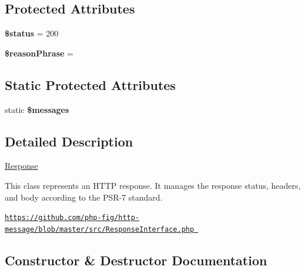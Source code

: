\subsection*{Protected Attributes}
\begin{DoxyCompactItemize}
\item 
\mbox{\label{class_pes_1_1_http_1_1_response_a58391ea75f2d29d5d708d7050b641c33}} 
{\bfseries \$status} = 200
\item 
\mbox{\label{class_pes_1_1_http_1_1_response_a78c4411594f692d36dd7b71e80bc8254}} 
{\bfseries \$reason\+Phrase} = \textquotesingle{}\textquotesingle{}
\end{DoxyCompactItemize}
\subsection*{Static Protected Attributes}
\begin{DoxyCompactItemize}
\item 
static {\bfseries \$messages}
\end{DoxyCompactItemize}


\subsection{Detailed Description}
\mbox{\hyperlink{class_pes_1_1_http_1_1_response}{Response}}

This class represents an H\+T\+TP response. It manages the response status, headers, and body according to the P\+S\+R-\/7 standard.

\mbox{\hyperlink{}{\href{https://github.com/php-fig/http-message/blob/master/src/ResponseInterface.php}{\tt https\+://github.\+com/php-\/fig/http-\/message/blob/master/src/\+Response\+Interface.\+php} }}

\subsection{Constructor \& Destructor Documentation}
\mbox{\label{class_pes_1_1_http_1_1_response_addbc35df9e7d4a465be0056eeb28c462}} 
